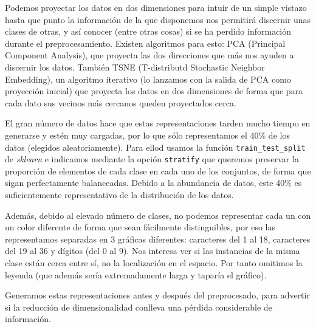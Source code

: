 \documentclass[a4]{article}
\begin{document}
Podemos proyectar los datos en dos dimensiones para intuir de un
simple vistazo hasta que punto la información de la que disponemos nos
permitirá discernir unas clases de otras, y así conocer (entre otras
cosas) si se ha perdido información durante el
preprocesamiento. Existen algoritmos para esto: PCA (Principal
Component Analysis), que proyecta las dos direcciones que más nos
ayuden a discernir los datos. También TSNE (T-distributd Stochastic
Neighbor Embedding), un algoritmo iterativo (lo lanzamos con la salida
de PCA como proyección inicial) que proyecta los datos en dos
dimensiones de forma que para cada dato sus vecinos más cercanos
queden proyectados cerca.

El gran número de datos hace que estas representaciones tarden mucho
tiempo en generarse y estén muy cargadas, por lo que sólo
representamos el 40\% de los datos (elegidos aleatoriamente). Para
ellod usamos la función \texttt{train\_test\_split} de
\textit{sklearn} e indicamos mediante la opción \texttt{stratify} que
queremos preservar la proporción de elementos de cada clase en cada
uno de los conjuntos, de forma que sigan perfectamente
balanceadas. Debido a la abundancia de datos, este 40\% es
suficientemente representativo de la distribución de los datos.

Además, debido al elevado número de clases, no podemos representar
cada un con un color diferente de forma que sean fácilmente
distinguibles, por eso las representamos separadas en 3 gráficas
diferentes: caracteres del 1 al 18, caracteres del 19 al 36 y dígitos
(del 0 al 9). Nos interesa ver si las instancias de la misma clase
están cerca entre sí, no la localización en el espacio. Por tanto
omitimos la leyenda (que además sería extremadamente larga y taparía
el gráfico).

Generamos estas representaciones antes y después del preprocesado,
para advertir si la reducción de dimensionalidad conlleva una pérdida
considerable de información.
\end{document}
